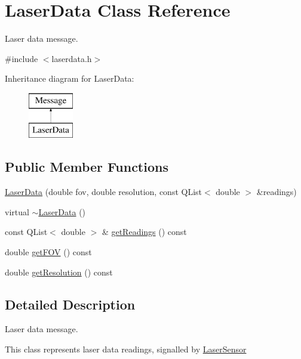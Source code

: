 \hypertarget{classLaserData}{
\section{LaserData Class Reference}
\label{classLaserData}
}


Laser data message.  




{\ttfamily \#include $<$laserdata.h$>$}

Inheritance diagram for LaserData:\begin{figure}[H]
\begin{center}
\leavevmode
\includegraphics[height=2.000000cm]{classLaserData}
\end{center}
\end{figure}
\subsection*{Public Member Functions}
\begin{DoxyCompactItemize}
\item 
\hyperlink{classLaserData_aa774147523cb75f1a29a48ae9e966357}{LaserData} (double fov, double resolution, const QList$<$ double $>$ \&readings)
\item 
virtual \hyperlink{classLaserData_a4e3ebdad7df74033e606281b118874e8}{$\sim$LaserData} ()
\item 
const QList$<$ double $>$ \& \hyperlink{classLaserData_a21e8ace6cf591b71f174c54dff409886}{getReadings} () const 
\item 
double \hyperlink{classLaserData_a66ec4933e7529639fcdecf0d4c93088a}{getFOV} () const 
\item 
double \hyperlink{classLaserData_ae883461416b168cdc243cf1f03aedf1d}{getResolution} () const 
\end{DoxyCompactItemize}


\subsection{Detailed Description}
Laser data message. 

This class represents laser data readings, signalled by \hyperlink{classLaserSensor}{LaserSensor}

